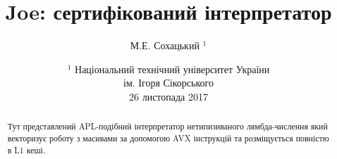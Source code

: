 \documentclass{article}
\begin{document}
\author { М.Е. Сохацький $^1$ }
\title { Joe: сертифікований інтерпретатор }
\date{ \small $^1$ Національний технічний університет України \\
       ім. Ігоря Сікорського \\
       26 листопада 2017 }
\maketitle

\begin{abstract}
Тут представлений APL-подібний інтерпретатор нетипизиваного лямбда-числення
який векторизує роботу з масивами за допомогою AVX інструкцій та
розміщується повністю в L1 кеші.

\end{abstract}
\end{document}
